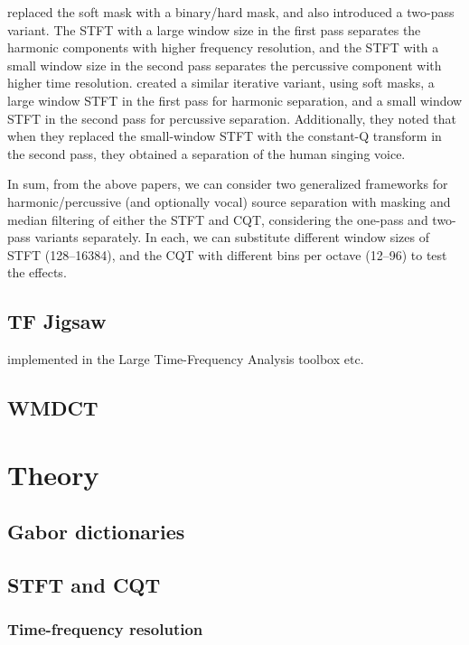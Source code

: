 \documentclass[letter,12pt]{article}
\begin{document}
\citet{driedger} replaced the soft mask with a binary/hard mask, and also introduced a two-pass variant. The STFT with a large window size in the first pass separates the harmonic components with higher frequency resolution, and the STFT with a small window size in the second pass separates the percussive component with higher time resolution. \citet{fitzgerald2} created a similar iterative variant, using soft masks, a large window STFT in the first pass for harmonic separation, and a small window STFT in the second pass for percussive separation. Additionally, they noted that when they replaced the small-window STFT with the constant-Q transform in the second pass, they obtained a separation of the human singing voice.

In sum, from the above papers, we can consider two generalized frameworks for harmonic/percussive (and optionally vocal) source separation with masking and median filtering of either the STFT and CQT, considering the one-pass and two-pass variants separately. In each, we can substitute different window sizes of STFT (128--16384), and the CQT with different bins per octave (12--96) to test the effects.

\subsection{TF Jigsaw}

implemented in the Large Time-Frequency Analysis toolbox \cite{ltfat} etc.

\subsection{WMDCT }

\section{Theory}
\label{sec:theory}

\subsection{Gabor dictionaries}

\subsection{STFT and CQT}

\subsubsection{Time-frequency resolution}
\end{document}
